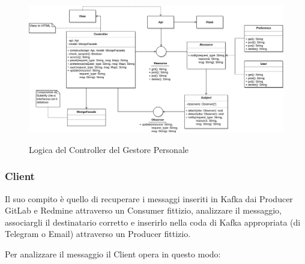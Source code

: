     \begin{figure}[H]
        \centering
        \includegraphics[width=\textwidth]{img/GP-View.png}\\
        \caption{Logica del Controller del Gestore Personale}
        \label{fig:GP-View}
    \end{figure}



\subsubsection{Client}
Il suo compito è quello di recuperare i messaggi inseriti in Kafka dai Producer GitLab e Redmine attraverso un Consumer fittizio, analizzare il messaggio, associargli il destinatario corretto e inserirlo nella coda di Kafka appropriata (di Telegram o Email) attraverso un Producer fittizio.

Per analizzare il messaggio il Client opera in questo modo:

